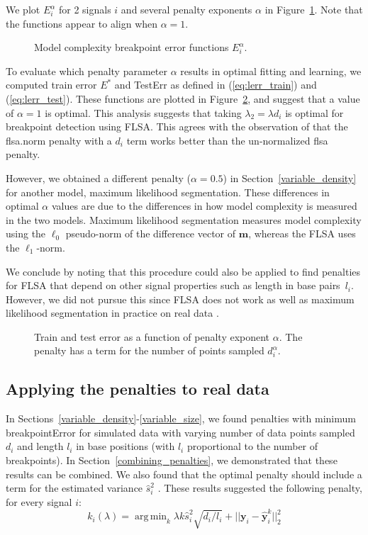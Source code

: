 \documentclass{article}
\newcommand{\fig}[3][H]{
  \begin{figure}[#1]
    \hskip -1cm
    
    \caption{#3}
    \label{fig:#2}
  \end{figure}
}
\DeclareMathOperator*{\argmin}{arg\,min}
\begin{document}
We plot $E_i^\alpha$ for 2 signals $i$ and several penalty exponents
$\alpha$ in Figure~\ref{fig:variable-density-berr-flsa}. Note that the
functions appear to align when $\alpha=1$.

\fig{variable-density-berr-flsa}{Model complexity breakpoint error
  functions $E_i^\alpha$.}

\newpage

To evaluate which penalty parameter $\alpha$ results in optimal
fitting and learning, we computed train error $E^*$ and TestErr as defined
in (\ref{eq:lerr_train}) and (\ref{eq:lerr_test}). These functions are
plotted in Figure~\ref{fig:variable-density-error-alpha-flsa}, and
suggest that a value of $\alpha=1$ is optimal. This analysis suggests
that taking $\lambda_2=\lambda d_i$ is optimal for breakpoint
detection using FLSA. This agrees with the observation of
\citet{HOCKING-breakpoints} that the flsa.norm penalty with a $d_i$
term works better than the un-normalized flsa penalty.

However, we obtained a different penalty ($\alpha=0.5$) in
Section~\ref{variable_density} for another model, maximum likelihood
segmentation. These differences in optimal $\alpha$ values are due to
the differences in how model complexity is measured in the two
models. Maximum likelihood segmentation measures model complexity
using the $\ell_0$ pseudo-norm of the difference vector of $\mathbf m$,
whereas the FLSA uses the $\ell_1$-norm.

We conclude by noting that this procedure could also be applied to
find penalties for FLSA that depend on other signal properties such as
length in base pairs~$l_i$. However, we did not pursue this since FLSA
does not work as well as maximum likelihood segmentation in practice
on real data \citep{HOCKING-breakpoints}.

\fig{variable-density-error-alpha-flsa}{Train and test error as a
  function of penalty exponent $\alpha$. The penalty has a term for
  the number of points sampled $d_i^\alpha$.}


\newpage

\subsection{Applying the penalties to real data}

In Sections~\ref{variable_density}-\ref{variable_size}, we found
penalties with minimum breakpointError for simulated data with varying
number of data points sampled $d_i$ and length $l_i$ in base positions
(with $l_i$ proportional to the number of breakpoints). In
Section~\ref{combining_penalties}, we demonstrated that these results
can be combined. We also found that the optimal penalty should include
a term for the estimated variance $\hat s_i^2$
\citep{HOCKING-phd-ch4}. These results suggested the following
penalty, for every signal $i$:
\begin{equation}
  \label{eq:composite_penalty}
  k_i(\lambda) = 
  \argmin_k
  \lambda k \hat s_i^2 \sqrt{d_i/l_i}  +
  ||\mathbf y_i - \mathbf{\hat y}_i^k||^2_2
\end{equation}
\end{document}
